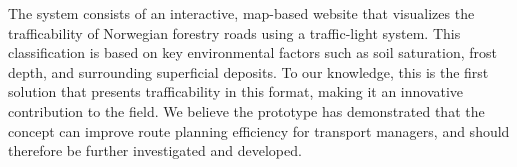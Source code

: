 The system consists of an interactive, map-based website that visualizes the trafficability of Norwegian forestry roads using a traffic-light system. This classification is based on key environmental factors such as soil saturation, frost depth, and surrounding superficial deposits. To our knowledge, this is the first solution that presents trafficability in this format, making it an innovative contribution to the field. We believe the prototype has demonstrated that the concept can improve route planning efficiency for transport managers, and should therefore be further investigated and developed.




